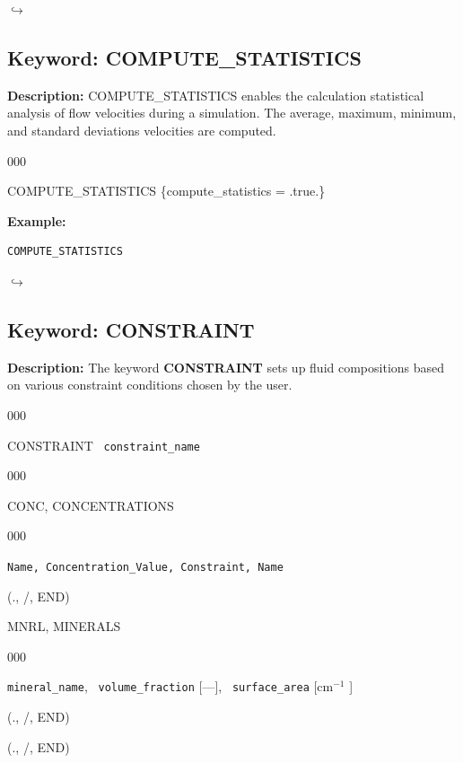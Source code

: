 \documentclass[12pt]{article}
\newcommand\return{{\hfill$\hookrightarrow$}}
\begin{document}
\hyperlink{target_key}{\return}


\newpage
\protect\hypertarget{target_stat}{}

\subsection{Keyword: COMPUTE\_STATISTICS}

\noindent
{\bf Description:}
COMPUTE\_STATISTICS enables the calculation statistical analysis of flow velocities during a simulation.  The average, maximum, minimum, and standard deviations velocities are computed.

\begin{deflist}{000}
\item [COMPUTE\_STATISTICS] \{compute\_statistics = .true.\}
\end{deflist}


\noindent
{\bf Example:}
\begin{verbatim}
COMPUTE_STATISTICS
\end{verbatim}

\hyperlink{target_key}{\return}


\newpage
\protect\hypertarget{target_constraint}{}

\subsection{Keyword: CONSTRAINT}

\noindent
{\bf Description:}
The keyword {\bf CONSTRAINT} sets up fluid compositions based on various constraint conditions chosen by the user.

\begin{deflist}{000}
\item [CONSTRAINT] \ {\tt constraint\_name}
\begin{deflist}{000}
\item[CONC, CONCENTRATIONS] ~
\begin{deflist}{000}
\item[{\tt Name, Concentration\_Value, Constraint, Name}] ~
\end{deflist}
\item[(., /, END)] ~


\item[MNRL, MINERALS] ~

\begin{deflist}{000}
\item[{\tt mineral\_name}, \ {\tt volume\_fraction} {[---]}, \ {\tt surface\_area} [cm$^{-1}$]]
\end{deflist}
\item[(., /, END)]
\end{deflist}
\item[(., /, END)]
\end{deflist}
\end{document}
